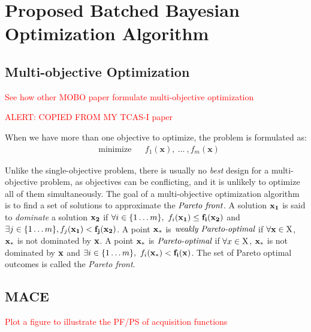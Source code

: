 \section{Proposed Batched Bayesian Optimization Algorithm}

\subsection{Multi-objective Optimization}\label{sec:MOForumlation}

\textcolor{red}{See how other MOBO paper formulate multi-objective optimization}


\textcolor{red}{ALERT: COPIED FROM MY TCAS-I paper}

When we have more than one objective to optimize, the problem is formulated as:
\begin{equation}
    \label{eq:MOFormulation}
    \begin{aligned}
        & \text{minimize} & & f_1(\bm{x}),~\dots~,f_m(\bm{x})
    \end{aligned}
\end{equation}

Unlike the single-objective problem, there is usually no \emph{best} design for
a multi-objective problem, as objectives can be conflicting, and it is unlikely
to optimize all of them simultaneously. The goal of a multi-objective
optimization algorithm is to find a set of solutions to approximate the
$\emph{Pareto front}$. A solution $\bf{x}_1$ is said to \emph{dominate} a
solution $\bf{x}_2$ if $\forall i \in \{1 \dots m\},~f_i(\bf{x}_1) \le
f_i(\bf{x}_2)$ and $\exists j \in \{1\dots m\}, f_j(\bf{x}_1) < f_j(\bf{x}_2)$.
A point $\bf{x}_*$ is $\emph{weakly Pareto-optimal}$ if $\forall \bf{x} \in
\bf{\textrm{X}}$, $\bf{x}_*$ is not dominated by $\bf{x}$.  A point $\bf{x}_*$
is $\emph{Pareto-optimal}$ if $\forall x \in \bf{\textrm{X}}$, $\bf{x}_*$ is
not dominated by $\bf{x}$ and $\exists i \in \{1 \dots m\},~f_i(\bf{x}_*) <
f_i(\bf{x})$. The set of Pareto optimal outcomes is called the \emph{Pareto
front}.

\subsection{MACE}


\textcolor{red}{Plot a figure to illustrate the PF/PS of acquisition functions}
